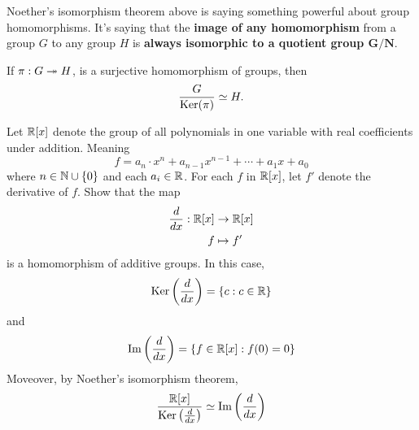 \documentclass{ximera}
\begin{document}
Noether's isomorphism theorem above is saying something powerful about
group homomorphisms. It's saying that the \textbf{image of any
  homomorphism} from a group $G$ to any group $H$ is \textbf{always
  isomorphic to a quotient group $\boldsymbol{G/N}$}.


\begin{corollary}
  If $\pi:G\twoheadrightarrow H$, is a surjective homomorphism of groups, then
  \[
  \frac{G}{\mathop{\mathrm{Ker}}\nolimits(\pi)} \simeq H.
  \]
\end{corollary}


\begin{example}
  Let $\mathbb R[x]$ denote the group of all polynomials in one variable with
  real coefficients under addition. Meaning
  \[
  f = a_n\cdot x^{n} + a_{n-1}x^{n-1} + \cdots + a_1x + a_0
  \]
  where $n\in\mathbb N\cup\{0\}$ and each $a_i\in\mathbb R$.  For each $f$ in $\mathbb R[x]$,
  let $f'$ denote the derivative of $f$. Show that the map
  \begin{align*}
    \frac{d}{dx}:\mathbb R[x]&\to\mathbb R[x]\\
    f  &\mapsto f'
  \end{align*}
  is a homomorphism of additive groups.  In this case,
  \[
  \mathop{\mathrm{Ker}}\nolimits\left(\frac{d}{dx}\right) = \{c:c\in \mathbb R\}
  \]
  and
  \[
  \operatorname{Im}\left(\frac{d}{dx}\right) = \{f\in\mathbb R[x]:f(0)=0\}
  \]
  Moveover, by Noether's isomorphism theorem,
  \[
  \frac{\mathbb R[x]}{\mathop{\mathrm{Ker}}\nolimits\left(\frac{d}{dx}\right)} \simeq \operatorname{Im}\left(\frac{d}{dx}\right)
  \]
  
\end{example}
\end{document}
